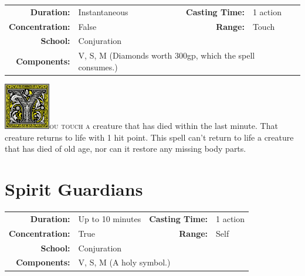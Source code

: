 \documentclass[12pt,showtrims]{memoir}
\begin{document}
{
\small\centering\vspace{-6pt}
\begin{tabular}{rlrl}
\toprule

\textbf{Duration:} & Instantaneous &
\textbf{Casting Time:} & 1 action \\
\textbf{Concentration:} & False &
\textbf{Range:} & Touch \\
\textbf{School:} & Conjuration \\
\textbf{Components:} & \multicolumn{3}{p{0.7\textwidth}}{V, S, M (Diamonds worth 300gp, which the spell consumes.)}\\

\bottomrule
\end{tabular}
}

\vspace{1\baselineskip}\noindent 
\lettrine[lines=4]{\includegraphics[height=58pt]{initials/Y.png}}{ou touch a} creature that has died within the last minute. That creature returns to life with 1 hit point. This spell can't return to life a creature that has died of old age, nor can it restore any missing body parts.

\newpage
\section*{Spirit Guardians}

{
\small\centering\vspace{-6pt}
\begin{tabular}{rlrl}
\toprule

\textbf{Duration:} & Up to 10 minutes &
\textbf{Casting Time:} & 1 action \\
\textbf{Concentration:} & True &
\textbf{Range:} & Self \\
\textbf{School:} & Conjuration \\
\textbf{Components:} & \multicolumn{3}{p{0.7\textwidth}}{V, S, M (A holy symbol.)}\\

\bottomrule
\end{tabular}
}
\end{document}
